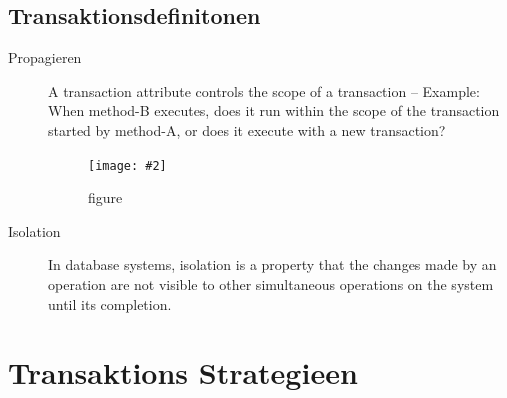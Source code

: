 \documentclass[a4paper,10pt]{scrreprt}
\newcommand{\pic}[2][figure]{\begin{figure}[h]
 \centering
 \texttt{[image: \#2]}
 \caption{#1}
\end{figure}
}
\begin{document}
\section{Transaktionsdefinitonen}
\begin{description}
 \item [Propagieren] A transaction attribute controls the scope of a transaction
– Example: When method-B executes, does it run within the scope of the
transaction started by method-A, or does it execute with a new transaction?
\pic{tpr.png}
\item[Isolation] In database systems, isolation is a property that the
changes made by an operation are not visible to other
simultaneous operations on the system until its
completion.
\end{description}

\chapter{Transaktions Strategieen}
\end{document}
